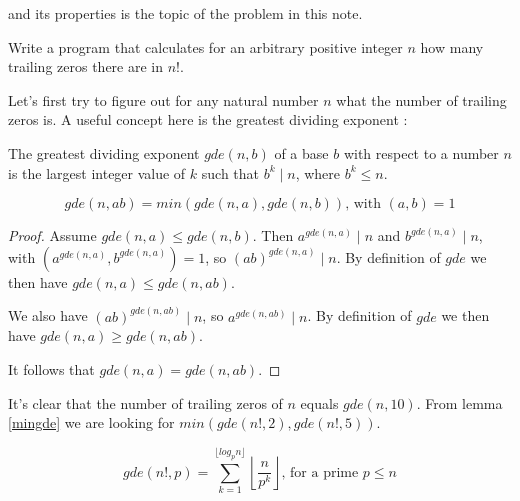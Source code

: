  and its properties is the topic of the problem in this note.

\vspace{10 mm}
\begin{problem}
Write a program that calculates for an arbitrary positive integer $n$ how many trailing zeros there are in $n!$.
\end{problem}

Let's first try to figure out for any natural number $n$ what the number of trailing zeros is. A useful concept here is the greatest dividing exponent \cite{mathworld01}:

\begin{defn}
The greatest dividing exponent  $gde(n, b)$ of a base  $b$ with respect to a number  $n$ is the largest integer value of  $k$ such that $b^k \mid n$, where $b^k \leq n$.
\end{defn}

\begin{lem}\label{mingde}
\begin{equation*}
gde(n, a b) = min(gde(n, a), gde(n, b))  \text{, with } (a, b) = 1
\end{equation*}
\end{lem}

\begin{proof}
Assume $gde(n,a) \leq gde(n, b)$. Then $a^{gde(n, a)} \mid n$ and $b^{gde(n, a)} \mid n$, with $(a^{gde(n, a)}, b^{gde(n, a)}) = 1$, so $(ab)^{gde(n, a)} \mid n$. By definition of $gde$ we then have $gde(n, a) \leq gde(n, ab)$. 

We also have $(ab)^{gde(n, ab)} \mid n$, so $a^{gde(n, ab)} \mid n$. By definition of $gde$ we then have $gde(n, a) \geq gde(n, ab)$. 

It follows that $gde(n, a)= gde(n, ab)$.
\end{proof}

It's clear that the number of trailing zeros of $n$ equals $gde(n, 10)$. From lemma \ref{mingde} we are looking for $min(gde(n!, 2), gde(n!, 5))$.\\

\begin{lem}\label{facgde}
\begin{equation*}
gde(n!, p) = \sum_{k = 1}^{\lfloor log_p n \rfloor} \left\lfloor\frac{n}{p^k}\right\rfloor \text{, for a prime } p \leq n
\end{equation*}
\end{lem}

